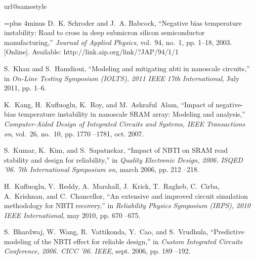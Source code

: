 \documentclass[11pt,a4paper]{article}
\begin{document}
\begin{thebibliography}{10}
\providecommand{\url}[1]{#1}
\csname url@samestyle\endcsname
\providecommand{\newblock}{\relax}
\providecommand{\bibinfo}[2]{#2}
\providecommand{\BIBentrySTDinterwordspacing}{\spaceskip=0pt\relax}
\providecommand{\BIBentryALTinterwordstretchfactor}{4}
\providecommand{\BIBentryALTinterwordspacing}{\spaceskip=\fontdimen2\font plus
\BIBentryALTinterwordstretchfactor\fontdimen3\font minus
  \fontdimen4\font\relax}
\providecommand{\BIBforeignlanguage}[2]{{\expandafter\ifx\csname l@#1\endcsname\relax
\typeout{** WARNING: IEEEtran.bst: No hyphenation pattern has been}\typeout{** loaded for the language `#1'. Using the pattern for}\typeout{** the default language instead.}\else
\language=\csname l@#1\endcsname
\fi
#2}}
\providecommand{\BIBdecl}{\relax}
\BIBdecl

\BIBentryALTinterwordspacing
D.~K. Schroder and J.~A. Babcock, ``Negative bias temperature instability: Road
  to cross in deep submicron silicon semiconductor manufacturing,''
  \emph{Journal of Applied Physics}, vol.~94, no.~1, pp. 1--18, 2003. [Online].
  Available: \url{http://link.aip.org/link/?JAP/94/1/1}
\BIBentrySTDinterwordspacing

S.~Khan and S.~Hamdioui, ``Modeling and mitigating nbti in nanoscale
  circuits,'' in \emph{On-Line Testing Symposium (IOLTS), 2011 IEEE 17th
  International}, July 2011, pp. 1--6.

K.~Kang, H.~Kufluoglu, K.~Roy, and M.~Ashraful~Alam, ``Impact of negative-bias
  temperature instability in nanoscale {SRAM} array: Modeling and analysis,''
  \emph{Computer-Aided Design of Integrated Circuits and Systems, IEEE
  Transactions on}, vol.~26, no.~10, pp. 1770 --1781, oct. 2007.

S.~Kumar, K.~Kim, and S.~Sapatnekar, ``Impact of {NBTI} on {SRAM} read
  stability and design for reliability,'' in \emph{Quality Electronic Design,
  2006. ISQED '06. 7th International Symposium on}, march 2006, pp. 212 --218.

H.~Kufluoglu, V.~Reddy, A.~Marshall, J.~Krick, T.~Ragheb, C.~Cirba,
  A.~Krishnan, and C.~Chancellor, ``An extensive and improved circuit
  simulation methodology for {NBTI} recovery,'' in \emph{Reliability Physics
  Symposium (IRPS), 2010 IEEE International}, may 2010, pp. 670 --675.

S.~Bhardwaj, W.~Wang, R.~Vattikonda, Y.~Cao, and S.~Vrudhula, ``Predictive
  modeling of the {NBTI} effect for reliable design,'' in \emph{Custom
  Integrated Circuits Conference, 2006. CICC '06. IEEE}, sept. 2006, pp. 189
  --192.


\end{thebibliography}
\end{document}
